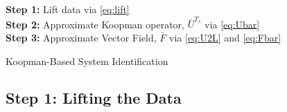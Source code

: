\begin{algorithm}
\SetAlgoLined
{}
\textbf{Step 1:} Lift data via \eqref{eq:lift} \\
\textbf{Step 2:} Approximate Koopman operator, $\bar{U}^{T_s}$ via \eqref{eq:Ubar} \\
\textbf{Step 3:} Approximate Vector Field, $\bar{F}$ via \eqref{eq:U2L} and \eqref{eq:Fbar} \\
\KwOut{$\bar{\Fv}$}
 \caption{Koopman-Based System Identification}
 \label{alg:sysid}
\end{algorithm}


\subsection{Step 1: Lifting the Data}   \label{sec:step1}

